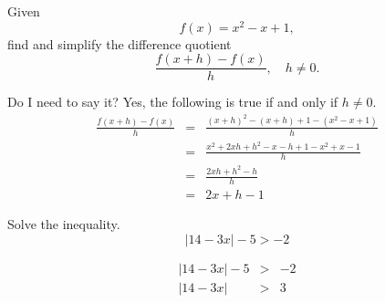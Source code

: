 \documentclass[12pt,addpoints, answers, fleqn]{exam}
\begin{document}
\begin{questions}
\question Given
\[
f\left( x \right) = x^2 - x + 1,
\]
find and simplify the difference quotient
\[
\frac{f\left( x + h\right) - f\left( x \right)}{h}, \quad h \neq 0.
\]
\begin{solution}
Do I need to say it? Yes, the following is true if and only if $h \neq 0$.
\begin{eqnarray*}
\frac{f\left( x + h\right) - f\left( x \right)}{h} &=& \frac{\left( x + h\right)^2 - \left( x + h\right) + 1 - \left( x^2 - x + 1\right)}{h}\\
&=& \frac{x^2 + 2xh + h^2 - x - h + 1 -  x^2 + x - 1}{h}\\
&=& \frac{ 2xh + h^2 - h}{h}\\
&=& \boxed{2x + h - 1}
\end{eqnarray*}
\end{solution}
\question Solve the inequality.
\[
\left|  14-3x  \right| -5 > -2
\]
\begin{solution}
\begin{eqnarray*}
\left|  14-3x  \right| -5 &>& -2\\
\left|  14-3x  \right|  &>& 3\\

\end{eqnarray*}
\end{solution}
\end{questions}
\end{document}
